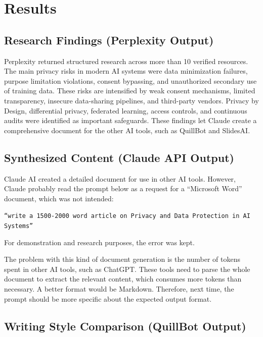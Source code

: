 \section{Results}

\subsection{Research Findings (Perplexity
Output)}

Perplexity returned structured research across
more than 10 verified resources. The main
privacy risks in modern AI systems were data
minimization failures, purpose limitation
violations, consent bypassing, and
unauthorized secondary use of training data.
These risks are intensified by weak consent
mechanisms, limited transparency, insecure
data-sharing pipelines, and third-party
vendors. Privacy by Design, differential
privacy, federated learning, access controls,
and continuous audits were identified as
important safeguards. These findings let
Claude create a comprehensive document for the
other AI tools, such as QuillBot and SlidesAI.

\subsection{Synthesized Content (Claude API
Output)}

Claude AI created a detailed document for use
in other AI tools. However, Claude probably
read the prompt below as a request for a
``Microsoft Word'' document, which was not
intended:

\begin{framed}
\small
\texttt{``write a 1500-2000 word
article on Privacy and Data Protection
in AI Systems''}
\end{framed}


For demonstration and research purposes, the
error was kept.

The problem with this kind of document
generation is the number of tokens spent in
other AI tools, such as ChatGPT. These tools
need to parse the whole document to extract the
relevant content, which consumes more tokens
than necessary. A better format would be
Markdown. Therefore, next time, the prompt
should be more specific about the expected
output format.

\subsection{Writing Style Comparison
(QuillBot Output)}

